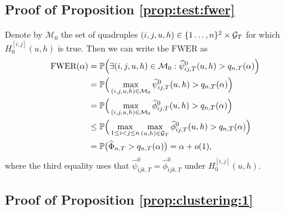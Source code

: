 \documentclass[12pt]{article}
\begin{document}
\subsection*{Proof of Proposition \ref{prop:test:fwer}}\label{subsec:app:fwer}


Denote by $\mathcal{M}_0$ the set of quadruples $(i, j, u, h) \in \{1\ldots, n\}^2 \times \mathcal{G}_T$ for which $H_0^{[i, j]}(u, h)$ is true. Then we can write the $\text{FWER}$ as
\begin{align*}
\text{FWER}(\alpha)
 & = \mathbb{P} \Big( \exists (i,j,u, h) \in \mathcal{M}_0: \widehat{\psi}^0_{ij,T}(u, h) > q_{n, T}(\alpha) \Big) \\
 & = \mathbb{P} \Big( \max_{(i, j, u, h) \in \mathcal{M}_0} \widehat{\psi}^0_{ij,T}(u, h) > q_{n, T}(\alpha) \Big) \\
 & = \mathbb{P} \Big( \max_{(i,j,u, h) \in \mathcal{M}_0} \widehat{\phi}^0_{ij,T}(u, h) > q_{n, T}(\alpha) \Big) \\
 & \le \mathbb{P} \Big( \max_{1 \le i < j \le n} \max_{(u, h) \in \mathcal{G}_T} \widehat{\phi}_{ij,T}^0(u, h) > q_{n, T}(\alpha) \Big) \\
 & = \mathbb{P} \big( \widehat{\Phi}_{n, T} > q_{n, T}(\alpha) \big) = \alpha + o(1),
\end{align*}
where the third equality uses that $\hat{\psi}^0_{ijk,T} = \hat{\phi}^0_{ijk,T}$ under $H_0^{[i, j]}(u, h)$.



\subsection*{Proof of Proposition \ref{prop:clustering:1}}
\end{document}
